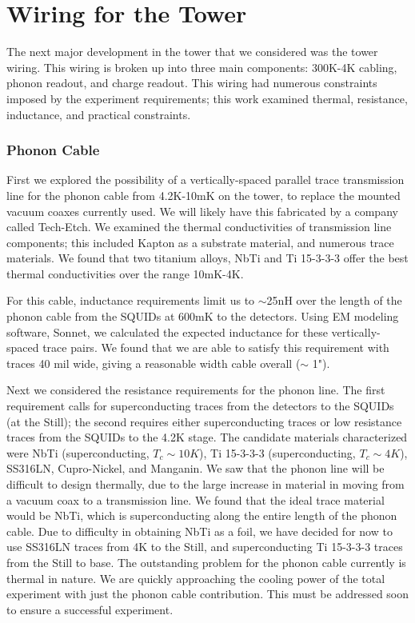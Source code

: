 \documentclass{report}
\begin{document}
\section{Wiring for the Tower}

The next major development in the tower that we considered was the tower wiring. This wiring is broken up into three main components: 300K-4K cabling, phonon readout, and charge readout. This wiring had numerous constraints imposed by the experiment requirements; this work examined thermal, resistance, inductance, and practical constraints.

\subsubsection{Phonon Cable}
First we explored the possibility of a vertically-spaced parallel trace transmission line for the phonon cable from 4.2K-10mK on the tower, to replace the mounted vacuum coaxes currently used. We will likely have this fabricated by a company called Tech-Etch. We examined the thermal conductivities of transmission line components; this included Kapton as a substrate material, and numerous trace materials. We found that two titanium alloys, NbTi and Ti 15-3-3-3 offer the best thermal conductivities over the range 10mK-4K.

For this cable, inductance requirements limit us to $\sim$25nH over the length of the phonon cable from the SQUIDs at 600mK to the detectors. Using EM modeling software, Sonnet, we calculated the expected inductance for these vertically-spaced trace pairs. We found that we are able to satisfy this requirement with traces 40 mil wide, giving a reasonable width cable overall ($\sim$ 1").

Next we considered the resistance requirements for the phonon line. The first requirement calls for superconducting traces from the detectors to the SQUIDs (at the Still); the second requires either superconducting traces or low resistance traces from the SQUIDs to the 4.2K stage. The candidate materials characterized were NbTi (superconducting, $T_c \sim 10K$), Ti 15-3-3-3 (superconducting, $T_c \sim 4K$), SS316LN, Cupro-Nickel, and Manganin. We saw that the phonon line will be difficult to design thermally, due to the large increase in material in moving from a vacuum coax to a transmission line. We found that the ideal trace material would be NbTi, which is superconducting along the entire length of the phonon cable. Due to difficulty in obtaining NbTi as a foil, we have decided for now to use SS316LN traces from 4K to the Still, and superconducting Ti 15-3-3-3 traces from the Still to base. The outstanding problem for the phonon cable currently is thermal in nature. We are quickly approaching the cooling power of the total experiment with just the phonon cable contribution. This must be addressed soon to ensure a successful experiment.
\end{document}
